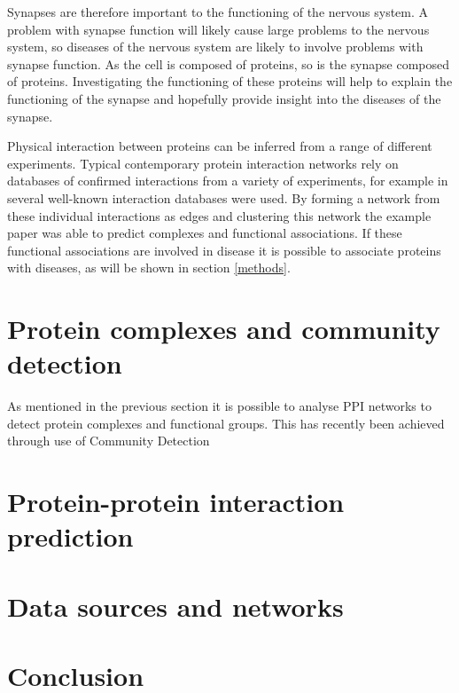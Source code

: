 Synapses are therefore important to the functioning of the nervous system.
A problem with synapse function will likely cause large problems to the nervous system, so diseases of the nervous system are likely to involve problems with synapse function.
As the cell is composed of proteins, so is the synapse composed of proteins.
Investigating the functioning of these proteins will help to explain the functioning of the synapse and hopefully provide insight into the diseases of the synapse.

Physical interaction between proteins can be inferred from a range of different experiments.
Typical contemporary protein interaction networks rely on databases of confirmed interactions from a variety of experiments, for example in \textcite{kenley_detecting_2011} several well-known interaction databases were used.
By forming a network from these individual interactions as edges and clustering this network the example paper was able to predict complexes and functional associations.
If these functional associations are involved in disease it is possible to associate proteins with diseases, as will be shown in section \ref{methods}.

\section{Protein complexes and community detection}

As mentioned in the previous section it is possible to analyse PPI networks to detect protein complexes and functional groups.
This has recently been achieved through use of Community Detection


\section{Protein-protein interaction prediction}

\lipsum[3-10]



\section{Data sources and networks}

\lipsum[11-15]

\section*{Conclusion}

\lipsum[16]
